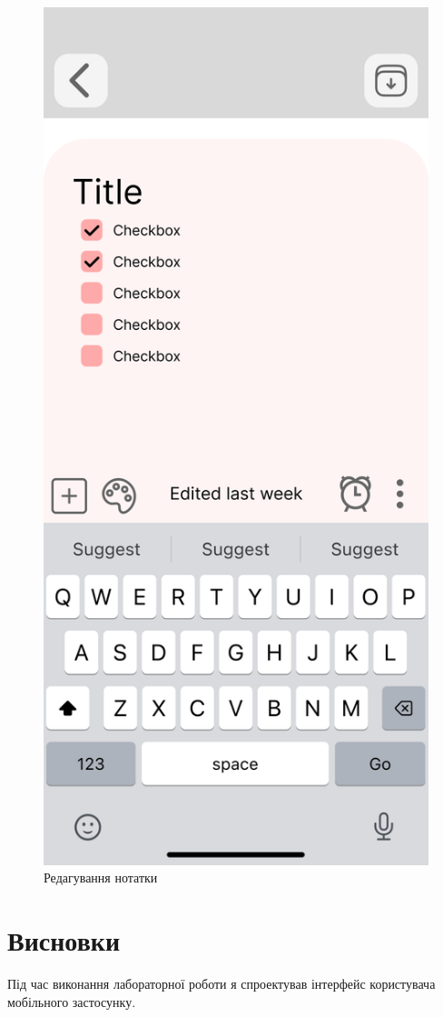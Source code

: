 \documentclass[oneside,14pt]{extarticle}
\begin{document}
\begin{normalsize}
\begin{figure}[H]
\begin{minipage}{0.48\textwidth}
		\end{minipage}\hfill
		\begin{minipage}{0.48\textwidth}
			\centering
			\includegraphics[scale=0.13]{Frame 10}
			\caption{Редагування нотатки}
		\end{minipage}
	\end{figure}
	
	\section*{Висновки}
	Під час виконання лабораторної роботи я спроектував інтерфейс користувача мобільного застосунку.
	    
\end{normalsize}
\end{document}

